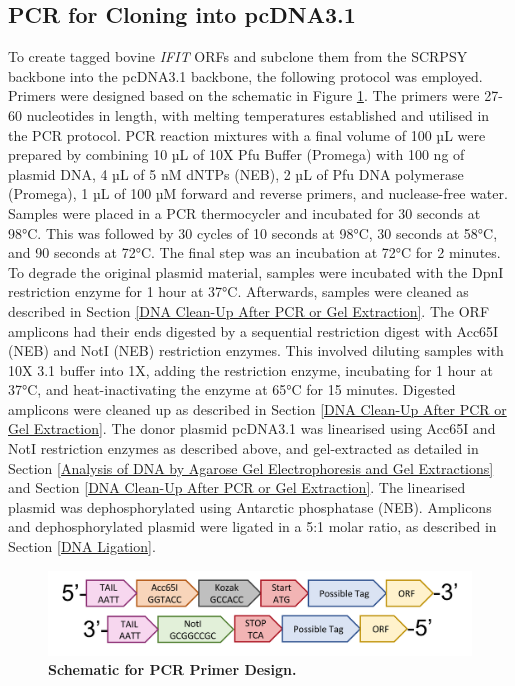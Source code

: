 \subsection{PCR for Cloning into pcDNA3.1} \label{subsec:PCR for Cloning into pcDNA3.1}
To create tagged bovine \textit{IFIT} ORFs and subclone them from the SCRPSY backbone into the pcDNA3.1 backbone, the following protocol was employed. Primers were designed based on the schematic in Figure \ref{fig:Schematic for PCR Primer Design}. The primers were 27-60 nucleotides in length, with melting temperatures established and utilised in the PCR protocol. PCR reaction mixtures with a final volume of 100 µL were prepared by combining 10 µL of 10X Pfu Buffer (Promega) with 100 ng of plasmid DNA, 4 µL of 5 nM dNTPs (NEB), 2 µL of Pfu DNA polymerase (Promega), 1 µL of 100 µM forward and reverse primers, and nuclease-free water. Samples were placed in a PCR thermocycler and incubated for 30 seconds at 98°C. This was followed by 30 cycles of 10 seconds at 98°C, 30 seconds at 58°C, and 90 seconds at 72°C. The final step was an incubation at 72°C for 2 minutes. To degrade the original plasmid material, samples were incubated with the DpnI restriction enzyme for 1 hour at 37°C. Afterwards, samples were cleaned as described in Section \ref{DNA Clean-Up After PCR or Gel Extraction}. The ORF amplicons had their ends digested by a sequential restriction digest with Acc65I (NEB) and NotI (NEB) restriction enzymes. This involved diluting samples with 10X 3.1 buffer into 1X, adding the restriction enzyme, incubating for 1 hour at 37°C, and heat-inactivating the enzyme at 65°C for 15 minutes. Digested amplicons were cleaned up as described in Section \ref{DNA Clean-Up After PCR or Gel Extraction}. The donor plasmid pcDNA3.1 was linearised using Acc65I and NotI restriction enzymes as described above, and gel-extracted as detailed in Section \ref{Analysis of DNA by Agarose Gel Electrophoresis and Gel Extractions} and Section \ref{DNA Clean-Up After PCR or Gel Extraction}. The linearised plasmid was dephosphorylated using Antarctic phosphatase (NEB). Amplicons and dephosphorylated plasmid were ligated in a 5:1 molar ratio, as described in Section \ref{DNA Ligation}.

\begin{figure}
    \centering
    \includegraphics[width=1\linewidth]{05. Methods//Figs/03. cloning scheme.pdf}
    \caption[Schematic for PCR Primer Design.]{\textbf{Schematic for PCR Primer Design.}}
    \label{fig:Schematic for PCR Primer Design}
\end{figure}

